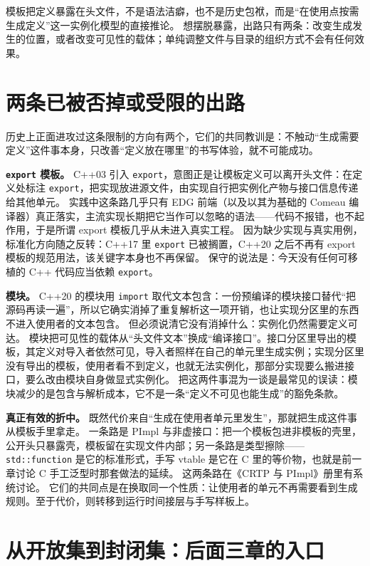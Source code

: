 \documentclass[12pt,a4paper,fontset=fandol]{ctexbook}
\newcommand{\cpp}[1]{C++#1}
\newcommand{\kw}[1]{\texttt{#1}}
\begin{document}
\begin{guideline}[title={把结论说成一条推论}]
模板把定义暴露在头文件，不是语法洁癖，也不是历史包袱，而是“在使用点按需生成定义”这一实例化模型的直接推论。
想摆脱暴露，出路只有两条：改变生成发生的位置，或者改变可见性的载体；单纯调整文件与目录的组织方式不会有任何效果。
\end{guideline}

\section{两条已被否掉或受限的出路}

历史上正面进攻过这条限制的方向有两个，它们的共同教训是：不触动“生成需要定义”这件事本身，只改善“定义放在哪里”的书写体验，就不可能成功。

\textbf{\kw{export} 模板。}
\cpp{03} 引入 \kw{export}，意图正是让模板定义可以离开头文件：在定义处标注 \kw{export}，把实现放进源文件，由实现自行把实例化产物与接口信息传递给其他单元。
实践中这条路几乎只有 EDG 前端（以及以其为基础的 Comeau 编译器）真正落实，主流实现长期把它当作可以忽略的语法——代码不报错，也不起作用，于是所谓 export 模板几乎从未进入真实工程。
因为缺少实现与真实用例，标准化方向随之反转：\cpp{17} 里 \kw{export} 已被搁置，\cpp{20} 之后不再有 export 模板的规范用法，该关键字本身也不再保留。
保守的说法是：今天没有任何可移植的 \cpp{} 代码应当依赖 \kw{export}。

\textbf{模块。}
\cpp{20} 的模块用 \kw{import} 取代文本包含：一份预编译的模块接口替代“把源码再读一遍”，所以它确实消掉了重复解析这一项开销，也让实现分区里的东西不进入使用者的文本包含。
但必须说清它没有消掉什么：实例化仍然需要定义可达。
模块把可见性的载体从“头文件文本”换成“编译接口”。接口分区里导出的模板，其定义对导入者依然可见，导入者照样在自己的单元里生成实例；实现分区里没有导出的模板，使用者看不到定义，也就无法实例化，那部分实现要么搬进接口，要么改由模块自身做显式实例化。
把这两件事混为一谈是最常见的误读：模块减少的是包含与解析成本，它不是一条“定义不可见也能生成”的豁免条款。

\textbf{真正有效的折中。}
既然代价来自“生成在使用者单元里发生”，那就把生成这件事从模板手里拿走。
一条路是 PImpl 与非虚接口：把一个模板包进非模板的壳里，公开头只暴露壳，模板留在实现文件内部；另一条路是类型擦除——\kw{std::function} 是它的标准形式，手写 vtable 是它在 C 里的等价物，也就是前一章讨论 C 手工泛型时那套做法的延续。
这两条路在《CRTP 与 PImpl》册里有系统讨论。
它们的共同点是在换取同一个性质：让使用者的单元不再需要看到生成规则。至于代价，则转移到运行时间接层与手写样板上。

\section{从开放集到封闭集：后面三章的入口}
\end{document}
